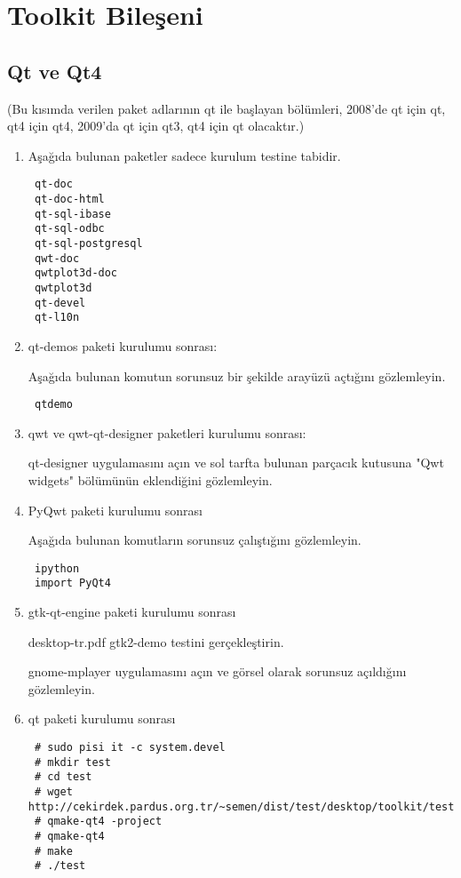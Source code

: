 \documentclass[a4paper,10pt]{article}
\begin{document}
\section{Toolkit Bileşeni}
\subsection*{Qt ve Qt4}

(Bu kısımda verilen paket adlarının qt ile başlayan bölümleri, 2008'de qt için qt, qt4 için qt4, 2009'da qt için qt3, qt4 için qt olacaktır.)
\begin{enumerate}
 \item Aşağıda bulunan paketler sadece kurulum testine tabidir.
\begin{verbatim}
 qt-doc
 qt-doc-html
 qt-sql-ibase
 qt-sql-odbc
 qt-sql-postgresql
 qwt-doc
 qwtplot3d-doc
 qwtplot3d
 qt-devel
 qt-l10n
\end{verbatim}
\item  qt-demos paketi kurulumu sonrası:

Aşağıda bulunan komutun sorunsuz bir şekilde arayüzü açtığını gözlemleyin.
\begin{verbatim}
 qtdemo
\end{verbatim}

\item qwt ve qwt-qt-designer paketleri kurulumu sonrası:

qt-designer uygulamasını açın ve sol tarfta bulunan parçacık kutusuna "Qwt widgets" bölümünün eklendiğini gözlemleyin.

\item PyQwt paketi kurulumu sonrası

Aşağıda bulunan komutların sorunsuz çalıştığını gözlemleyin.
\begin{verbatim}
 ipython
 import PyQt4
\end{verbatim}


\item gtk-qt-engine paketi kurulumu sonrası

desktop-tr.pdf gtk2-demo testini gerçekleştirin.

gnome-mplayer uygulamasını açın ve görsel olarak sorunsuz açıldığını gözlemleyin.

 \item qt paketi kurulumu sonrası

\begin{verbatim}
 # sudo pisi it -c system.devel
 # mkdir test
 # cd test
 # wget http://cekirdek.pardus.org.tr/~semen/dist/test/desktop/toolkit/test.cpp
 # qmake-qt4 -project
 # qmake-qt4
 # make
 # ./test
\end{verbatim}


\end{enumerate}
\end{document}
